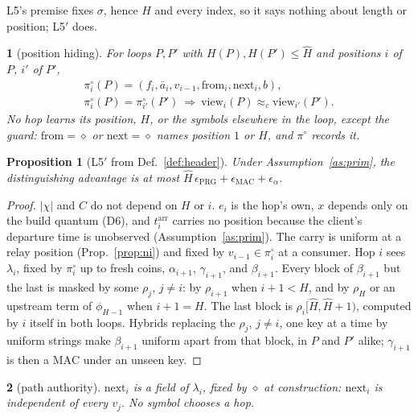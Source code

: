 \documentclass[journal]{IEEEtran}
\newtheorem{proposition}{Proposition}
\newcommand{\namedhead}{}
\newtheorem*{namedenv}{\namedhead}
\newenvironment{lawL}[2]{\renewcommand{\namedhead}{Law #1}%
  \begin{namedenv}[#2]}{\end{namedenv}}
\newcommand{\cl}{\diamond}
\newcommand{\view}{\mathrm{view}}
\newcommand{\nxt}{\mathrm{next}}
\newcommand{\frm}{\mathrm{from}}
\newcommand{\arr}{t^{\mathrm{arr}}}
\newcommand{\eqc}{\approx_{c}}
\newcommand{\Hm}{\hat H}
\newcommand{\PRG}{\mathrm{PRG}}
\newcommand{\MAC}{\mathrm{MAC}}
\begin{document}
L5's premise fixes $\sigma$, hence $H$ and every index, so it says nothing
about length or position; L5$'$ does.

\begin{lawL}{L5$'$}{position hiding}
For loops $P,P'$ with $H(P),H(P')\le\Hm$ and positions $i$ of $P$, $i'$
of $P'$,
\begin{gather*}
\pi^{\circ}_i(P)=(f_i,\bar a_i,v_{i-1},\frm_i,\nxt_i,b),\\
\pi^{\circ}_i(P)=\pi^{\circ}_{i'}(P')\ \Rightarrow\
\view_i(P)\eqc\view_{i'}(P') .
\end{gather*}
No hop learns its position, $H$, or the symbols elsewhere in the loop,
except the guard: $\frm=\cl$ or $\nxt=\cl$ names position $1$ or $H$, and
$\pi^{\circ}$ records it.
\end{lawL}

\begin{proposition}[L5$'$ from Def.~\ref{def:header}]\label{prop:pos}
Under Assumption~\ref{as:prim}, the distinguishing advantage is at most
$\Hm\,\epsilon_{\PRG}+\epsilon_{\MAC}+\epsilon_{\alpha}$.
\end{proposition}
\begin{proof}
$|\chi|$ and $C$ do not depend on $H$ or $i$.  $e_i$ is the hop's own,
$x$ depends only on the build quantum (D6), and $\arr_i$ carries no
position because the client's departure time is unobserved
(Assumption~\ref{as:prim}).  The carry is uniform at a relay position
(Prop.~\ref{prop:ni}) and fixed by $v_{i-1}\in\pi^{\circ}_i$ at a
consumer.  Hop $i$
sees $\lambda_i$, fixed by $\pi^{\circ}_i$ up to fresh coins, $\alpha_{i+1}$,
$\gamma_{i+1}$, and $\beta_{i+1}$.  Every block of $\beta_{i+1}$ but the
last is masked by some $\rho_j$, $j\ne i$: by $\rho_{i+1}$ when $i+1<H$,
and by $\rho_H$ or an upstream term of $\phi_{H-1}$ when $i+1=H$.  The last
block is $\rho_i[\Hm,\Hm{+}1)$, computed by $i$ itself in both loops.
Hybrids replacing the $\rho_j$, $j\ne i$, one key at a time by uniform
strings make $\beta_{i+1}$ uniform apart from that block, in $P$ and $P'$
alike; $\gamma_{i+1}$ is then a $\MAC$ under an unseen key.
\end{proof}

\begin{lawL}{L6}{path authority}
$\nxt_i$ is a field of $\lambda_i$, fixed by $\cl$ at construction:
$\nxt_i$ is independent of every $v_j$.  No symbol chooses a hop.
\end{lawL}
\end{document}
